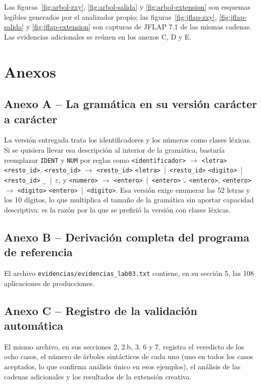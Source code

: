 \documentclass[11pt,letterpaper]{article}
\newcommand{\nt}[1]{\texttt{\textless #1\textgreater}}
\begin{document}
Las figuras~\ref{fig:arbol-zxy}, \ref{fig:arbol-salida} y \ref{fig:arbol-extension} son esquemas
legibles generados por el analizador propio; las figuras~\ref{fig:jflap-zxy},
\ref{fig:jflap-salida} y \ref{fig:jflap-extension} son capturas de JFLAP 7.1 de las mismas
cadenas. Las evidencias adicionales se reúnen en los anexos C, D y E.

\clearpage
\section*{Anexos}

\subsection*{Anexo A -- La gramática en su versión carácter a carácter}
La versión entregada trata los
identificadores y los números como clases léxicas. Si se quisiera llevar esa descripción al
interior de la gramática, bastaría reemplazar \texttt{IDENT} y \texttt{NUM} por reglas como
\nt{identificador} $\rightarrow$ \nt{letra} \nt{resto\_id},
\nt{resto\_id} $\rightarrow$ \nt{resto\_id} \nt{letra} \,|\, \nt{resto\_id} \nt{digito} \,|\,
\nt{resto\_id} \texttt{\_} \,|\, $\varepsilon$, y
\nt{numero} $\rightarrow$ \nt{entero} \,|\, \nt{entero} \texttt{.} \nt{entero},
\nt{entero} $\rightarrow$ \nt{digito} \nt{entero} \,|\, \nt{digito}. Esa versión exige enumerar las
52 letras y los 10 dígitos, lo que multiplica el tamaño de la gramática sin aportar capacidad
descriptiva: es la razón por la que se prefirió la versión con clases léxicas.

\subsection*{Anexo B -- Derivación completa del programa de referencia}
El archivo \texttt{evidencias/\allowbreak evidencias\_lab03.txt} contiene, en su sección 5,
las 108 aplicaciones de producciones.

\subsection*{Anexo C -- Registro de la validación automática}
El mismo archivo, en sus secciones 2, 2.b,
3, 6 y 7, registra el veredicto de los ocho casos, el número de árboles sintácticos de cada uno
(uno en todos los casos aceptados, lo que confirma análisis único en esos ejemplos), el análisis de las cadenas
adicionales y los resultados de la extensión creativa.
\end{document}
